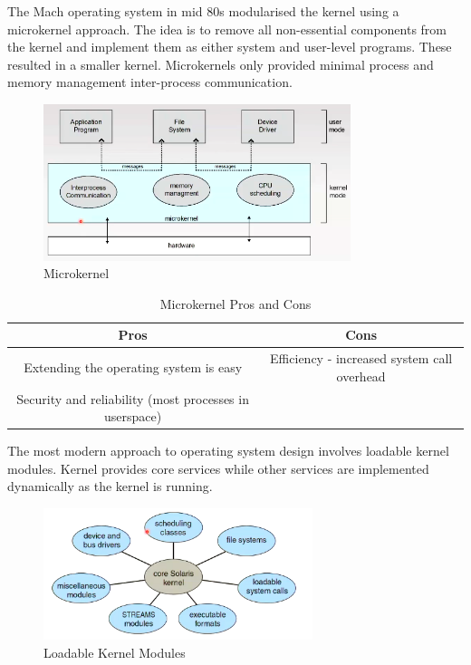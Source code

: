\documentclass[a4paper]{article}
\theoremstyle{plain}
\theoremstyle{definition}
\newtheorem{defn}{Definition}[section]
\theoremstyle{remark}
\begin{document}
\begin{tcolorbox}[colback=black!3!white,colframe=black!60!white,title=\begin{defn}Microkernel \label{Microkernel}\end{defn}]
The Mach operating system in mid 80s modularised the kernel using a microkernel approach. The idea is to remove all non-essential components from the kernel and implement them as either system and user-level programs. These resulted in a smaller kernel. Microkernels only provided minimal process and memory management inter-process communication.
\begin{figure}[H]
	\centering
	\includegraphics[width=0.8\textwidth]{three.png}
	\caption{Microkernel}
	\label{fig:three-png}
\end{figure}
	\begin{table}[H]
		\centering
		\caption{Microkernel Pros and Cons}
		\label{tab:laytab}
		\begin{tabular}{|c|c|}
		\hline Pros & Cons \\
		\hline
		Extending the operating system is easy & Efficiency - increased system call overhead \\
		Security and reliability (most processes in userspace) & \\
		\hline
		\end{tabular}
	\end{table}
\end{tcolorbox}
\begin{tcolorbox}[colback=black!3!white,colframe=black!60!white,title=\begin{defn}Loadable Kernel Module \label{Loadable Kernel Module}\end{defn}]
The most modern approach to operating system design involves loadable kernel modules. Kernel provides core services while other services are implemented dynamically as the kernel is running.
\begin{figure}[H]
	\centering
	\includegraphics[width=0.7\textwidth]{four.png}
	\caption{Loadable Kernel Modules}
	\label{fig:four-png}
\end{figure}
\end{tcolorbox}
\end{document}

